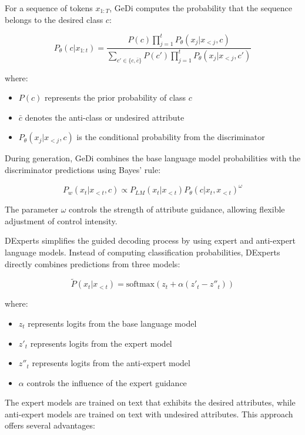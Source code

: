 For a sequence of tokens $x_{1:T}$, GeDi computes the probability that the sequence belongs to the desired class $c$:

\begin{equation}
    P_\theta(c|x_{1:t}) = \frac{P(c)\prod_{j=1}^t P_\theta(x_j|x_{<j}, c)}{\sum_{c' \in \{c,\bar{c}\}} P(c')\prod_{j=1}^t P_\theta(x_j|x_{<j}, c')}
\end{equation}

where:
\begin{itemize}
    \item $P(c)$ represents the prior probability of class $c$
    \item $\bar{c}$ denotes the anti-class or undesired attribute
    \item $P_\theta(x_j|x_{<j}, c)$ is the conditional probability from the discriminator
\end{itemize}

During generation, GeDi combines the base language model probabilities with the discriminator predictions using Bayes' rule:

\begin{equation}
    P_w(x_t|x_{<t}, c) \propto P_{LM}(x_t|x_{<t})P_\theta(c|x_t, x_{<t})^\omega
\end{equation}

The parameter $\omega$ controls the strength of attribute guidance, allowing flexible adjustment of control intensity.

DExperts simplifies the guided decoding process by using expert and anti-expert language models. Instead of computing classification probabilities, DExperts directly combines predictions from three models:

\begin{equation}
    \tilde{P}(x_t|x_{<t}) = \text{softmax}(z_t + \alpha(z'_t - z''_t))
\end{equation}

where:
\begin{itemize}
    \item $z_t$ represents logits from the base language model
    \item $z'_t$ represents logits from the expert model
    \item $z''_t$ represents logits from the anti-expert model
    \item $\alpha$ controls the influence of the expert guidance
\end{itemize}

The expert models are trained on text that exhibits the desired attributes, while anti-expert models are trained on text with undesired attributes. This approach offers several advantages:

